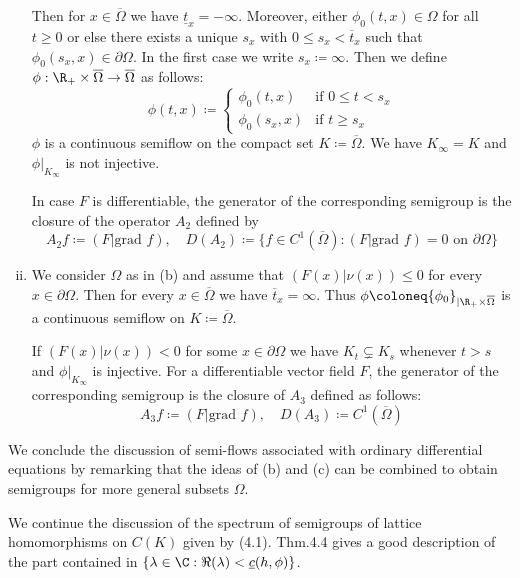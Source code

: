 \begin{example}
\begin{enumerate}[(i), wide]
	Then for $x \in \overline{\Omega}$ we have $\underline{t}_{x} = -\infty$.
	Moreover, either $\phi_{0}(t,x) \in \Omega$ for all $t \geq 0$ or else there exists a unique $s_{x}$ with $0 \leq s_{x} < \overline{t}_{x}$ such that $\phi_{0}(s_{x},x) \in \partial\Omega$.
	In the first case we write $s_{x} \coloneq \infty$.
	Then we define $\phi: \R_{+} \times \overline{\Omega} \to \overline{\Omega}$ as follows:
	\[\phi(t,x) \coloneq \begin{cases}
		\phi_{0}(t,x) & \text{if } 0 \leq t < s_{x} \\
		\phi_{0}(s_{x},x) & \text{if } t \geq s_{x}
	\end{cases}\]
	$\phi$ is a continuous semiflow on the compact set $K \coloneq \overline{\Omega}$.
	We have $K_{\infty} = K$ and $\phi|_{K_{\infty}}$ is not injective.
	
	In case $F$ is differentiable, the generator of the corresponding semigroup is the closure of the operator $A_{2}$ defined by
	\[A_{2}f \coloneq (F|\text{grad }f), \quad D(A_{2}) \coloneq \{f \in C^1(\overline{\Omega}) : (F|\text{grad }f) = 0 \text{ on } \partial\Omega\}\]
	
	\item 
	We consider $\Omega$ as in (b) and assume that $(F(x)|\nu(x)) \leq 0$ for every $x \in \partial\Omega$.
	Then for every $x \in \overline{\Omega}$ we have $\overline{t}_{x} = \infty$.
	Thus $\phi \coloneq {\phi_{0}}_{|\R_{+}\times\overline{\Omega}}$ is a continuous semiflow on $K \coloneq \overline{\Omega}$.
	
	If $(F(x)|\nu(x)) < 0$ for some $x \in \partial\Omega$ we have $K_{t} \subsetneq K_{s}$ whenever $t > s$ and $\phi|_{K_{\infty}}$ is injective.
	For a differentiable vector field $F$, the generator of the corresponding semigroup is the closure of $A_{3}$ defined as follows:
	\[A_{3}f \coloneq (F|\text{grad }f), \quad D(A_{3}) \coloneq C^1(\overline{\Omega})\]
\end{enumerate}
\end{example}

We conclude the discussion of semi-flows associated with ordinary differential equations by remarking that the ideas of (b) and (c) can be combined to obtain semigroups for more general subsets $\Omega$.

We continue the discussion of the spectrum of semigroups of lattice homomorphisms on $C(K)$ given by (4.1).
Thm.4.4 gives a good description of the part contained in $\{\lambda \in \C : \Re(\lambda) < \underline{c}(h,\phi)\}$.

